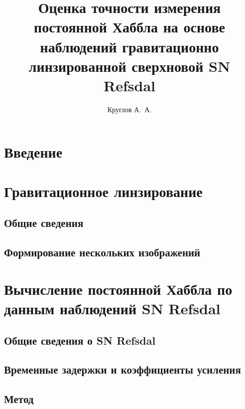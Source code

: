 \documentclass{mipt-thesis-ms}
\numberwithin{equation}{chapter}
\begin{document}
\title{Оценка точности измерения постоянной Хаббла на основе наблюдений гравитационно линзированной сверхновой SN Refsdal}
\author{Круглов А.\ А.}

\frontmatter
\mainmatter


\titlepage

\newpage

\newpage


\newpage
\tableofcontents

\pagestyle{miptthesis}

\chapter{Введение}


\chapter{Гравитационное линзирование}

\section{Общие сведения}

\section{Формирование нескольких изображений}


\chapter{Вычисление постоянной Хаббла по данным наблюдений SN Refsdal}

\section{Общие сведения о SN Refsdal}

\section{Временные задержки и коэффициенты усиления}

\section{Метод}

\end{document}
